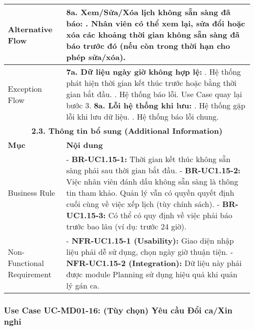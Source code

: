 \begin{longtable}{|m{4cm}|p{11cm}|}
\hline
Alternative Flow & \textbf{8a. Xem/Sửa/Xóa lịch không sẵn sàng đã báo:} \newline    1. Nhân viên có thể xem lại, sửa đổi hoặc xóa các khoảng thời gian không sẵn sàng đã báo trước đó (nếu còn trong thời hạn cho phép sửa/xóa). \\
\hline
Exception Flow & \textbf{7a. Dữ liệu ngày giờ không hợp lệ:} \newline    1. Hệ thống phát hiện thời gian kết thúc trước hoặc bằng thời gian bắt đầu. \newline    2. Hệ thống báo lỗi. Use Case quay lại bước 3. \newline \textbf{8a. Lỗi hệ thống khi lưu:} \newline    1. Hệ thống gặp lỗi khi lưu dữ liệu. \newline    2. Hệ thống báo lỗi chung. \\
\hline
\multicolumn{2}{|c|}{\textbf{2.3. Thông tin bổ sung (Additional Information)}} \\
\hline
\textbf{Mục} & \textbf{Nội dung} \\
\hline
Business Rule & - \textbf{BR-UC1.15-1:} Thời gian kết thúc không sẵn sàng phải sau thời gian bắt đầu. \newline - \textbf{BR-UC1.15-2:} Việc nhân viên đánh dấu không sẵn sàng là thông tin tham khảo. Quản lý vẫn có quyền quyết định cuối cùng về việc xếp lịch (tùy chính sách). \newline - \textbf{BR-UC1.15-3:} Có thể có quy định về việc phải báo trước bao lâu (ví dụ: trước 24 giờ). \\
\hline
Non-Functional Requirement & - \textbf{NFR-UC1.15-1 (Usability):} Giao diện nhập liệu phải dễ sử dụng, chọn ngày giờ thuận tiện. \newline - \textbf{NFR-UC1.15-2 (Integration):} Dữ liệu này phải được module Planning sử dụng hiệu quả khi quản lý gán ca. \\
\hline
\end{longtable}

\subsubsection{Use Case UC-MD01-16: (Tùy chọn) Yêu cầu Đổi ca/Xin nghỉ}

